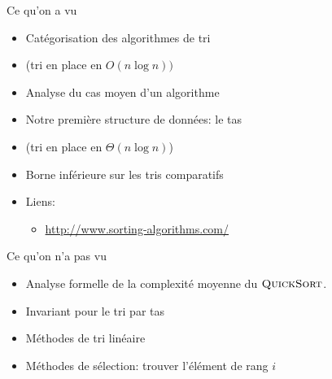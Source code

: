 \begin{frame}{Ce qu'on a vu}

\begin{itemize}
\item Catégorisation des algorithmes de tri
\item {} (tri en place en $O(n\log n))$
\item Analyse du cas moyen d'un algorithme
\item Notre première structure de données: le tas
\item {} (tri en place en $\Theta(n\log n)$)
\item Borne inférieure sur les tris comparatifs

\bigskip

\item Liens:
\begin{itemize}
\item \url{http://www.sorting-algorithms.com/}
\end{itemize}

\end{itemize}

\end{frame}

\begin{frame}{Ce qu'on n'a pas vu}

\begin{itemize}
\item Analyse formelle de la complexité moyenne du $\textnormal{\scshape QuickSort}$.
\item Invariant pour le tri par tas
\item Méthodes de tri linéaire
\item Méthodes de sélection: trouver l'élément de rang $i$
\end{itemize}

\end{frame}
